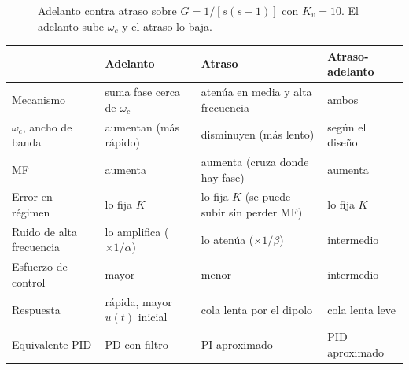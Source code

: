 \documentclass[11pt,a4paper]{article}
\newcommand{\wc}{\omega_c}
\begin{document}
\begin{figure}[ht]
\centering
{}
\caption{Adelanto contra atraso sobre $G=1/[s(s+1)]$ con $K_v=10$. El adelanto sube $\wc$ y el atraso lo baja.}
\label{fig:comp}
\end{figure}

\begin{center}
\small
\begin{tabularx}{\linewidth}{@{}l>{\raggedright\arraybackslash}X>{\raggedright\arraybackslash}X>{\raggedright\arraybackslash}X@{}}
\toprule
 & Adelanto & Atraso & Atraso-adelanto\\
\midrule
Mecanismo & suma fase cerca de $\wc$ & atenúa en media y alta frecuencia & ambos\\
$\wc$, ancho de banda & aumentan (más rápido) & disminuyen (más lento) & según el diseño\\
MF & aumenta & aumenta (cruza donde hay fase) & aumenta\\
Error en régimen & lo fija $K$ & lo fija $K$ (se puede subir sin perder MF) & lo fija $K$\\
Ruido de alta frecuencia & lo amplifica ($\times1/\alpha$) & lo atenúa ($\times1/\beta$) & intermedio\\
Esfuerzo de control & mayor & menor & intermedio\\
Respuesta & rápida, mayor $u(t)$ inicial & cola lenta por el dipolo & cola lenta leve\\
Equivalente PID & PD con filtro & PI aproximado & PID aproximado\\
\bottomrule
\end{tabularx}
\end{center}
\end{document}
